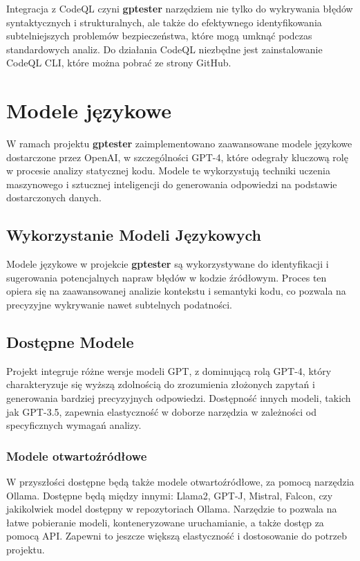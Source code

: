 Integracja z CodeQL czyni \textbf{gptester} narzędziem nie tylko do wykrywania błędów syntaktycznych i strukturalnych, ale także do efektywnego identyfikowania subtelniejszych problemów bezpieczeństwa, które mogą umknąć podczas standardowych analiz.
Do działania CodeQL niezbędne jest zainstalowanie CodeQL CLI, które można pobrać ze strony GitHub.

\section{Modele językowe}
\label{sec:modele_jezykowe}

W ramach projektu \textbf{gptester} zaimplementowano zaawansowane modele językowe dostarczone przez OpenAI, w szczególności GPT-4, które odegrały kluczową rolę w procesie analizy statycznej kodu. Modele te wykorzystują techniki uczenia maszynowego i sztucznej inteligencji do generowania odpowiedzi na podstawie dostarczonych danych.

\subsection{Wykorzystanie Modeli Językowych}
Modele językowe w projekcie \textbf{gptester} są wykorzystywane do identyfikacji i sugerowania potencjalnych napraw błędów w kodzie źródłowym. Proces ten opiera się na zaawansowanej analizie kontekstu i semantyki kodu, co pozwala na precyzyjne wykrywanie nawet subtelnych podatności.

\subsection{Dostępne Modele}
Projekt integruje różne wersje modeli GPT, z dominującą rolą GPT-4, który charakteryzuje się wyższą zdolnością do zrozumienia złożonych zapytań i generowania bardziej precyzyjnych odpowiedzi. Dostępność innych modeli, takich jak GPT-3.5, zapewnia elastyczność w doborze narzędzia w zależności od specyficznych wymagań analizy. 

\subsubsection{Modele otwartoźródłowe}
W przyszłości dostępne będą także modele otwartoźródłowe, za pomocą narzędzia Ollama. Dostępne będą między innymi: Llama2, GPT-J, Mistral, Falcon, czy jakikolwiek model dostępny w repozytoriach Ollama. Narzędzie to pozwala na łatwe pobieranie modeli, konteneryzowane uruchamianie, a także dostęp za pomocą API. Zapewni to jeszcze większą elastyczność i dostosowanie do potrzeb projektu.


